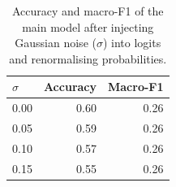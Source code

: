 \begin{table}[t]\centering
\caption{Accuracy and macro-F1 of the main model after injecting Gaussian noise ($\sigma$) into logits and renormalising probabilities.}
\label{tab:robustness}
\begin{tabular}{lrr}
\toprule
$\sigma$ & Accuracy & Macro-F1 \\
\midrule
0.00 & 0.60 & 0.26 \\
0.05 & 0.59 & 0.26 \\
0.10 & 0.57 & 0.26 \\
0.15 & 0.55 & 0.26 \\
\bottomrule
\end{tabular}
\end{table}
